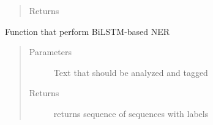 \documentclass[letterpaper,10pt,english]{sphinxmanual}
\begin{document}
\begin{fulllineitems}
\begin{fulllineitems}
\begin{quote}
\begin{description}
\begin{itemize}
\end{itemize}

\item[{Returns}] \leavevmode


\end{description}\end{quote}

\end{fulllineitems}


\begin{fulllineitems}
\label{\detokenize{contents:ner_plugins.NER_BiLSTM_Glove_i2b2.NER_BiLSTM_Glove_i2b2.perform_NER}}
Function that perform BiLSTM-based NER
\begin{quote}\begin{description}
\item[{Parameters}] \leavevmode
{} \textendash{} Text that should be analyzed and tagged

\item[{Returns}] \leavevmode
returns sequence of sequences with labels

\end{description}\end{quote}

\end{fulllineitems}


\end{fulllineitems}

\end{document}

